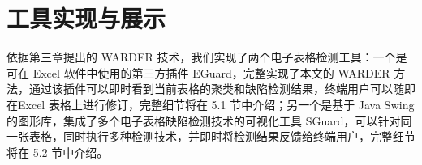 \chapter{工具实现与展示}

依据第三章提出的 WARDER 技术，我们实现了两个电子表格检测工具：一个是可在 Excel 软件中使用的第三方插件 EGuard，完整实现了本文的 WARDER 方法，通过该插件可以即时看到当前表格的聚类和缺陷检测结果，终端用户可以随即在Excel 表格上进行修订，完整细节将在 5.1 节中介绍；另一个是基于 Java Swing 的图形库，集成了多个电子表格缺陷检测技术的可视化工具 SGuard，可以针对同一张表格，同时执行多种检测技术，并即时将检测结果反馈给终端用户，完整细节将在 5.2 节中介绍。




